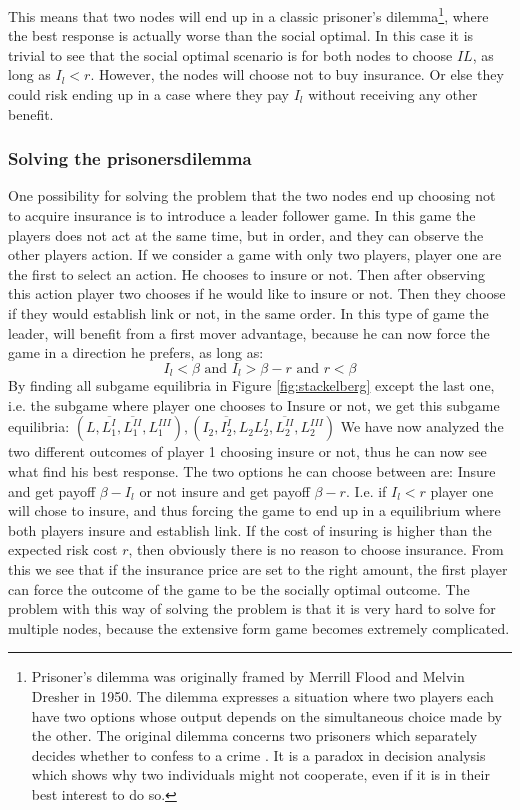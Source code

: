 This means that two nodes will end up in a classic prisoner's dilemma\footnote{Prisoner's dilemma was originally framed by Merrill Flood and Melvin Dresher in 1950. The dilemma expresses a situation where two players each have two options whose output depends on the simultaneous choice made by the other. The original dilemma concerns two prisoners which separately decides whether to confess to a crime \cite{oxfordPrisonersDilemma}. It is a paradox in decision analysis which shows why two individuals might not cooperate, even if it is in their best interest to do so.}, where the best response is actually worse than the social optimal. In this case it is trivial to see that the social optimal scenario is for both nodes to choose $IL$, as long as $I_{l}<r$. However, the nodes will choose not to buy insurance. Or else they could risk ending up in a case where they pay $I_{l}$ without receiving any other benefit. 

  
\subsubsection{Solving the prisonersdilemma}
One possibility for solving the problem that the two nodes end up choosing not to acquire insurance is to introduce a leader follower game. In this game the players does not act at the same time, but in order, and they can observe the other players action.
If we consider a game with only two players, player one are the first to select an action. He chooses to insure or not. Then after observing this action player two chooses if he would like to insure or not. Then they choose if they would establish link or not, in the same order.
In this type of game the leader, will benefit from a first mover advantage, because he can now force the game in a direction he prefers, as long as:
\begin{equation}
I_{l}<\beta \text{ and } I_{l}>\beta-r \text{ and } r<\beta
\label{eq:stackelbergcondition}
\end{equation}
By finding all subgame equilibria in Figure \ref{fig:stackelberg} except the last one, i.e. the subgame where player one chooses to Insure or not, we get this subgame equilibria: $(L,\overline{L^{I}_{1}},\overline{L^{II}_{1}},L^{III}_{1}), (I_{2},\overline{I^{I}_{2}},L_{2}L^{I}_{2},\overline{L^{II}_{2}},L^{III}_{2})$
We have now analyzed the two different outcomes of player 1 choosing insure or not, thus he can now see what find his best response. The two options he can choose between are: Insure and get payoff $\beta-I_{l}$ or not insure and get payoff $\beta-r$. I.e. if $I_{l}<r$ player one will chose to insure, and thus forcing the game to end up in a equilibrium where both players insure and establish link. If the cost of insuring is higher than the expected risk cost $r$, then obviously there is no reason to choose insurance.
From this we see that if the insurance price are set to the right amount, the first player can force the outcome of the game to be the socially optimal outcome. 
The problem with this way of solving the problem is that it is very hard to solve for  multiple nodes, because the extensive form game becomes extremely complicated.

